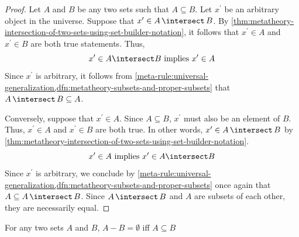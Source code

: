 \begin{proof}
    Let \( A \) and \( B \) be any two sets such that \( A \subseteq B \).
    Let \( x^{\prime} \) be an arbitrary object in the universe.
    Suppose that \( x^{\prime} \in A \,{\intersect}\, B \).
    By \cref{thm:metatheory-intersection-of-two-sets-using-set-builder-notation}, it follows that \( x^{\prime} \in A \) and \( x^{\prime} \in B \)
    are both true statements. Thus,
    \begin{equation*}
        x^{\prime} \in A \intersect B \ \text{implies} \ x^{\prime} \in A
    \end{equation*}
    Since \( x^{\prime} \) is arbitrary, it follows from \cref{meta-rule:universal-generalization,dfn:metatheory-subsets-and-proper-subsets} that
    \( A \,{\intersect}\, B \subseteq A \).

    \vspace{0.3cm}
    \noindent
    Conversely, suppose that \( x^{\prime} \in A \). Since \( A \subseteq B \), \( x^{\prime} \) must also be an element of \( B \).
    Thus, \( x^{\prime} \in A \) and \( x^{\prime} \in B \) are both true.
    In other words, \( x^{\prime} \in A \,{\intersect}\, B \) by \cref{thm:metatheory-intersection-of-two-sets-using-set-builder-notation}.
    \begin{equation*}
        x^{\prime} \in A \ \text{implies} \ x^{\prime} \in A \intersect B
    \end{equation*}
    Since \( x^{\prime} \) is arbitrary, we conclude by \cref{meta-rule:universal-generalization,dfn:metatheory-subsets-and-proper-subsets} once again
    that \( A \subseteq A \,{\intersect}\, B \). Since \( A \,{\intersect}\, B \) and \( A \) are subsets of each other, they are necessarily equal.
\end{proof}

\begin{thm}
     \label{thm:metatheory-A-minus-B-is-empty-iff-A-is-a-subset-of-B}
    For any two sets \( A \) and \( B \), \( A - B = \emptyset \) iff \( A \subseteq B \)
\end{thm}

